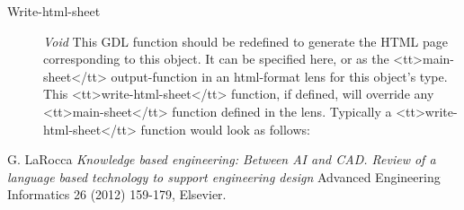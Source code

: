 \documentclass [11pt]{book}
\begin{document}
\begin{itemize}
\begin{description}

\item [Write-html-sheet]
\emph{Void} This GDL function should be redefined to generate the HTML page corresponding to this object.
It can be specified here, or as the <tt>main-sheet</tt> output-function in an html-format lens for this
object's type. This <tt>write-html-sheet</tt> function, if defined,  will override any <tt>main-sheet</tt>
function defined in the lens. Typically a <tt>write-html-sheet</tt> function would look as follows:


\end{description}







\end{itemize}





\backmatter

\begin{thebibliography}{1}

 G. LaRocca \emph{Knowledge based engineering: Between AI
and CAD. Review of a language based technology to support engineering design} 
Advanced Engineering Informatics 26 (2012) 159-179, Elsevier.

\end{thebibliography}


\printindex
\end{document}
